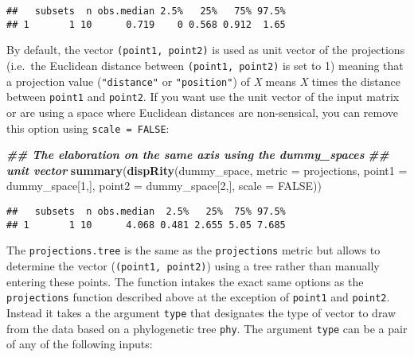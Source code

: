 \documentclass[
]{book}
\newenvironment{Shaded}{\begin{snugshade}}{\end{snugshade}}
\newcommand{\AttributeTok}[1]{\textcolor[rgb]{0.13,0.29,0.53}{#1}}
\newcommand{\ConstantTok}[1]{\textcolor[rgb]{0.56,0.35,0.01}{#1}}
\newcommand{\DecValTok}[1]{\textcolor[rgb]{0.00,0.00,0.81}{#1}}
\newcommand{\DocumentationTok}[1]{\textcolor[rgb]{0.56,0.35,0.01}{\textbf{\textit{#1}}}}
\newcommand{\FunctionTok}[1]{\textcolor[rgb]{0.13,0.29,0.53}{\textbf{#1}}}
\newcommand{\NormalTok}[1]{#1}
\begin{document}
\begin{verbatim}
##   subsets  n obs.median 2.5%   25%   75% 97.5%
## 1       1 10      0.719    0 0.568 0.912  1.65
\end{verbatim}

By default, the vector \texttt{(point1,\ point2)} is used as unit vector of the projections (i.e.~the Euclidean distance between \texttt{(point1,\ point2)} is set to 1) meaning that a projection value (\texttt{"distance"} or \texttt{"position"}) of \emph{X} means \emph{X} times the distance between \texttt{point1} and \texttt{point2}.
If you want use the unit vector of the input matrix or are using a space where Euclidean distances are non-sensical, you can remove this option using \texttt{scale\ =\ FALSE}:

\begin{Shaded}
\begin{Highlighting}[]
\DocumentationTok{\#\# The elaboration on the same axis using the dummy\_space\textquotesingle{}s}
\DocumentationTok{\#\# unit vector}
\FunctionTok{summary}\NormalTok{(}\FunctionTok{dispRity}\NormalTok{(dummy\_space, }\AttributeTok{metric =}\NormalTok{ projections,}
                              \AttributeTok{point1 =}\NormalTok{ dummy\_space[}\DecValTok{1}\NormalTok{,],}
                              \AttributeTok{point2 =}\NormalTok{ dummy\_space[}\DecValTok{2}\NormalTok{,],}
                              \AttributeTok{scale =} \ConstantTok{FALSE}\NormalTok{))}
\end{Highlighting}
\end{Shaded}

\begin{verbatim}
##   subsets  n obs.median  2.5%   25%  75% 97.5%
## 1       1 10      4.068 0.481 2.655 5.05 7.685
\end{verbatim}

The \texttt{projections.tree} is the same as the \texttt{projections} metric but allows to determine the vector (\texttt{(point1,\ point2)}) using a tree rather than manually entering these points.
The function intakes the exact same options as the \texttt{projections} function described above at the exception of \texttt{point1} and \texttt{point2}.
Instead it takes a the argument \texttt{type} that designates the type of vector to draw from the data based on a phylogenetic tree \texttt{phy}.
The argument \texttt{type} can be a pair of any of the following inputs:
\end{document}
